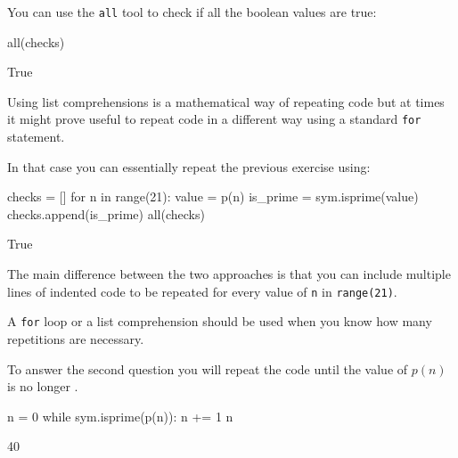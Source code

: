 You can use the \texttt{all} tool to check if all the boolean values are true:




\begin{pyin}
all(checks)
\end{pyin}





\begin{raw}
True
\end{raw}

\begin{note}
Using list comprehensions is a mathematical way of repeating code but at times
it might prove useful to repeat code in a different way using a standard \texttt{for}
statement.
\end{note}



In that case you can essentially repeat the previous exercise using:

\begin{pyin}
checks = []
for n in range(21):
    value = p(n)
    is_prime = sym.isprime(value)
    checks.append(is_prime)
all(checks)
\end{pyin}





\begin{raw}
True
\end{raw}





The main difference between the two approaches is that you can include multiple
lines of indented code to be repeated for every value of \texttt{n} in
\texttt{range(21)}.


\begin{note}
A \texttt{for} loop or a list comprehension should be used when you know how many
repetitions are necessary.
\end{note}



To answer the second question you will repeat the code until the value of \(p(n)\)
is no longer .




\begin{pyin}
n = 0
while sym.isprime(p(n)):
    n += 1
n
\end{pyin}





\begin{raw}
40
\end{raw}


